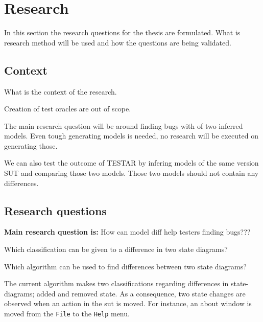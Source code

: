 \section{Research} \label{questions}
    In this section the research questions for the thesis are formulated. What is research method will be used and how the questions are being validated.

    \subsection{Context}
    What is the context of the research. 
    
    Creation of test oracles are out of scope.
    
    The main research question will be around finding bugs with of two inferred models. Even tough generating models is needed, no research will be executed on generating those.
    
    We can also test the outcome of TESTAR by infering models of the same version SUT and comparing those two models. Those two models should not contain any differences. 

    \subsection{Research questions}
        
        \textbf{Main research question is:} How can model diff help testers finding bugs???
        
        
        \begin{questions}
            \item Which classification can be given to a difference in two state diagrams? \label{rq:classifications} 
            \begin{questions}
                \item Which algorithm can be used to find differences between two state diagrams? \label{rq:algorithm}    
            \end{questions}
        \end{questions}
        
        The current algorithm \cite{stateDiff} makes two classifications regarding differences in state-diagrams; added and removed state. As a consequence, two state changes are observed when an action in the \acrshort{sut} is moved. For instance, an about window is moved from the \verb|File| to the \verb|Help| menu. 
        
